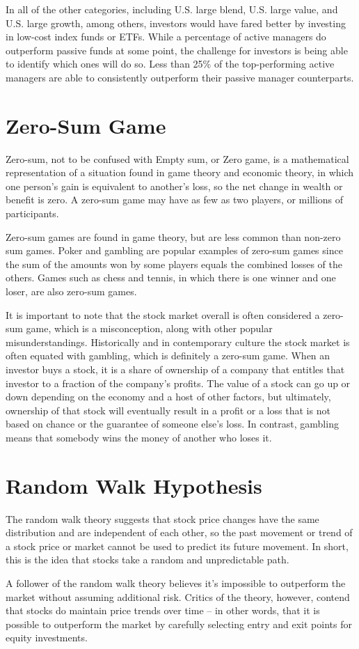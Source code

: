 In all of the other categories, including U.S. large blend, U.S. large value, and U.S. large growth, among others, investors would have fared better by investing in low-cost index funds or ETFs. While a percentage of active managers do outperform passive funds at some point, the challenge for investors is being able to identify which ones will do so. Less than 25\% of the top-performing active managers are able to consistently outperform their passive manager counterparts.

\section{Zero-Sum Game}
Zero-sum, not to be confused with Empty sum, or Zero game, is a mathematical representation of a situation found in game theory and economic theory, in which one person’s gain is equivalent to another’s loss, so the net change in wealth or benefit is zero. A zero-sum game may have as few as two players, or millions of participants.

Zero-sum games are found in game theory, but are less common than non-zero sum games. Poker and gambling are popular examples of zero-sum games since the sum of the amounts won by some players equals the combined losses of the others. Games such as chess and tennis, in which there is one winner and one loser, are also zero-sum games.

It is important to note that the stock market overall is often considered a zero-sum game, which is a misconception, along with other popular misunderstandings. Historically and in contemporary culture the stock market is often equated with gambling, which is definitely a zero-sum game. When an investor buys a stock, it is a share of ownership of a company that entitles that investor to a fraction of the company's profits. The value of a stock can go up or down depending on the economy and a host of other factors, but ultimately, ownership of that stock will eventually result in a profit or a loss that is not based on chance or the guarantee of someone else's loss. In contrast, gambling means that somebody wins the money of another who loses it.

\section{Random Walk Hypothesis}
The random walk theory suggests that stock price changes have the same distribution and are independent of each other, so the past movement or trend of a stock price or market cannot be used to predict its future movement. In short, this is the idea that stocks take a random and unpredictable path.

A follower of the random walk theory believes it's impossible to outperform the market without assuming additional risk. Critics of the theory, however, contend that stocks do maintain price trends over time – in other words, that it is possible to outperform the market by carefully selecting entry and exit points for equity investments.